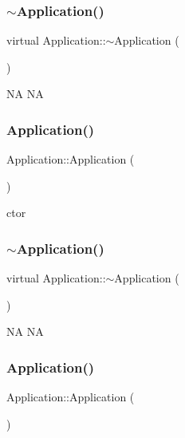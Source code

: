 \subsubsection{\texorpdfstring{$\sim$\+Application()}{~Application()}\hspace{0.1cm}{\footnotesize\ttfamily [3/11]}}
{\footnotesize\ttfamily virtual Application\+::$\sim$\+Application (\begin{DoxyParamCaption}{ }\end{DoxyParamCaption})\hspace{0.3cm}{\ttfamily [virtual]}}

NA  NA \mbox{\label{classApplication_afa8cc05ce6b6092be5ecdfdae44e05f8}} 
\subsubsection{\texorpdfstring{Application()}{Application()}\hspace{0.1cm}{\footnotesize\ttfamily [4/11]}}
{\footnotesize\ttfamily Application\+::\+Application (\begin{DoxyParamCaption}{ }\end{DoxyParamCaption})}

ctor \mbox{\label{classApplication_a20573928a0d53fb96d929513bc5acde6}} 
\subsubsection{\texorpdfstring{$\sim$\+Application()}{~Application()}\hspace{0.1cm}{\footnotesize\ttfamily [4/11]}}
{\footnotesize\ttfamily virtual Application\+::$\sim$\+Application (\begin{DoxyParamCaption}{ }\end{DoxyParamCaption})\hspace{0.3cm}{\ttfamily [virtual]}}

NA  NA \mbox{\label{classApplication_afa8cc05ce6b6092be5ecdfdae44e05f8}} 
\subsubsection{\texorpdfstring{Application()}{Application()}\hspace{0.1cm}{\footnotesize\ttfamily [5/11]}}
{\footnotesize\ttfamily Application\+::\+Application (\begin{DoxyParamCaption}{ }\end{DoxyParamCaption})}

